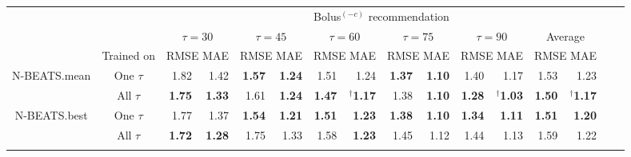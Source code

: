 \documentclass[journal,article,submit,moreauthors,pdftex]{Definitions/mdpi}
\begin{document}
\begin{table}[t]
\begin{center}
\begin{tabular}{|c|c|rr|rr|rr|rr|rr|rr|rr}
    \cline{3-14}
    \multicolumn{2}{c|}{} & \multicolumn{12}{c|}{Bolus$^{(-c)}$ recommendation}\\
    \cline{3-14}
    \multicolumn{2}{c|}{} & \multicolumn{2}{c|}{$\tau=30$} & \multicolumn{2}{c|}{$\tau=45$} & \multicolumn{2}{c|}{$\tau=60$} & \multicolumn{2}{c|}{$\tau=75$} & \multicolumn{2}{c|}{$\tau=90$} & \multicolumn{2}{c|}{Average}\\
    \cline{2-14}
     \multicolumn{1}{c|}{}& Trained on & \multicolumn{2}{c|}{\scriptsize RMSE MAE} & \multicolumn{2}{c|}{\scriptsize RMSE MAE} & \multicolumn{2}{c|}{\scriptsize RMSE MAE} & \multicolumn{2}{c|}{\scriptsize RMSE MAE} & \multicolumn{2}{c|}{\scriptsize RMSE MAE} & \multicolumn{2}{c|}{\scriptsize RMSE MAE} \\
    \hline
    \multirow{2}{*}{N-BEATS.mean} & One $\tau$ & 1.82 & 1.42 & {\bf 1.57} & {\bf 1.24} & 1.51 & 1.24 & {\bf 1.37} & {\bf 1.10} & 1.40 & 1.17 & 1.53 & 1.23\\
    & All $\tau$ & {\bf 1.75} & {\bf 1.33} & 1.61 & {\bf 1.24} & {\bf 1.47} & $^\dagger${\bf 1.17} & 1.38 & {\bf 1.10} & {\bf 1.28} & $^\dagger${\bf 1.03} & {\bf 1.50} & $^\dagger${\bf 1.17}\\
    \hline
    \multirow{2}{*}{N-BEATS.best} & One $\tau$ & 1.77 & 1.37 & {\bf 1.54} & {\bf 1.21} & {\bf 1.51} & {\bf 1.23} & {\bf 1.38} & {\bf 1.10} & {\bf 1.34} & {\bf 1.11} & {\bf 1.51} & {\bf 1.20}\\
    & All $\tau$ & {\bf 1.72} & {\bf 1.28} & 1.75 & 1.33 & 1.58 & {\bf 1.23} & 1.45 & 1.12 & 1.44 & 1.13 & 1.59 & 1.22\\
    \hline
    
    \multicolumn{14}{c}{}\\[-1.5ex]


\end{tabular}
\end{center}
\end{table}
\end{document}

